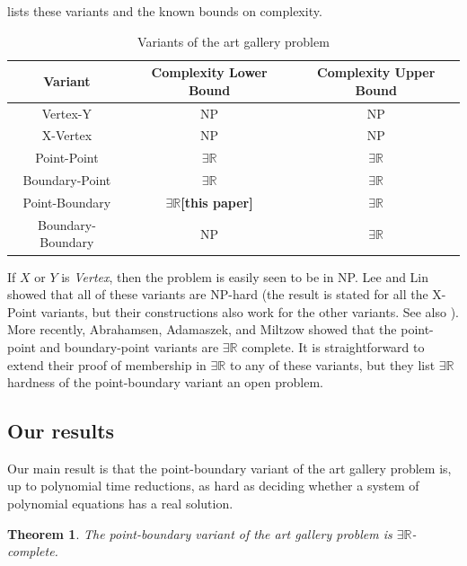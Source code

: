 \documentclass[11pt]{article}
\newcommand{\rr}{\mathbb R}
\theoremstyle{plain}
\newtheorem{theorem}{Theorem}
\theoremstyle{definition}
\numberwithin{theorem}{section}
\begin{document}
 lists these variants and the known bounds on complexity.

\begin{table}[ht]
\begin{center}
\begin{tabu}{|c|c|c|}
\hline
Variant&Complexity Lower Bound&Complexity Upper Bound\\
\hline
Vertex-Y&NP\cite{NPHardness}&NP\\
X-Vertex&NP\cite{NPHardness}&NP\\
Point-Point&$\exists\rr$\cite{ExistsRHardness}&$\exists\rr$\cite{ExistsRHardness}\\
Boundary-Point&$\exists\rr$\cite{ExistsRHardness}&$\exists\rr$\cite{ExistsRHardness}\\
Point-Boundary&$\mathbf{\exists\rr}${\bf [this paper]}&$\exists\rr$\cite{ExistsRHardness}\\
Boundary-Boundary&NP\cite{NPHardness}&$\exists\rr$\cite{ExistsRHardness}\\
\hline
\end{tabu}
\caption{Variants of the art gallery problem}
\label{tab:InitialsTable}
\end{center}
\end{table}

If $X$ or $Y$ is \emph{Vertex}, then the problem is easily seen to be in NP. Lee and Lin \cite{NPHardness} showed that all of these variants are NP-hard (the result is stated for all the X-Point variants, but their constructions also work for the other variants. See also \cite{BoundaryNPHard}). More recently, Abrahamsen, Adamaszek, and Miltzow \cite{ExistsRHardness} showed that the point-point and boundary-point variants are $\exists\rr$ complete. It is straightforward to extend their proof of membership in $\exists\rr$ to any of these variants, but they list $\exists\rr$ hardness of the point-boundary variant an open problem.

\subsection{Our results}

Our main result is that the point-boundary variant of the art gallery problem is, up to polynomial time reductions, as hard as deciding whether a system of polynomial equations has a real solution.


\begin{theorem}\label{BGMain}
The point-boundary variant of the art gallery problem is $\exists\rr$-complete.
\end{theorem}
\end{document}
